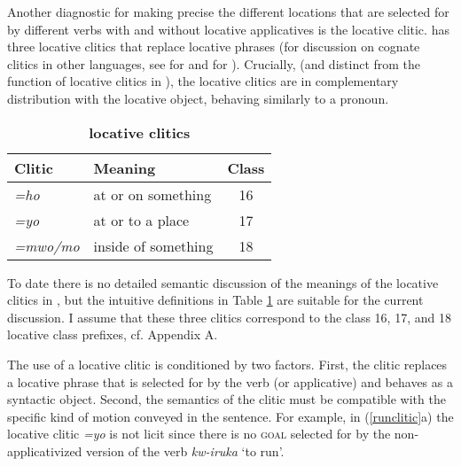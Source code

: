 \documentclass[output=paper]{langsci/langscibook}
\begin{document}
Another diagnostic for making precise the different locations that are selected for by different verbs with and without locative applicatives is the locative clitic.  has three locative clitics that  replace locative phrases (for discussion on cognate clitics in other languages, see \citet{diercks:2011} for  and \citet{simango:2012} for ). 	Crucially, (and distinct from the function of locative clitics in ), the locative clitics are in complementary distribution with the locative object, behaving similarly to a pronoun. 
%
\begin{table}[ht]
      \begin{center}	
\caption{\textbf{ locative clitics}}
      \begin{tabular}[t]{llc}\\\hline
	      Clitic			& Meaning				& Class \\\hline
			\emph{=ho}  & at or on something	& 16 \\
		      
		\emph{=yo} 	&  at or to a place 		& 17 \\

		\emph{=mwo/mo}  &  inside of something & 18\\
      
      \hline
	\end{tabular}
\label{tab:clitic} 
			\end{center}
\end{table}
%
To date there is no detailed semantic discussion of the meanings of the locative clitics in , but the intuitive definitions in Table \ref{tab:clitic} are suitable for the current discussion. I assume that these three clitics correspond to the class 16, 17, and 18 locative class prefixes, cf. Appendix A.  

The use of a locative clitic is conditioned by two factors. First, the clitic replaces a locative phrase that is selected for by the verb (or applicative) and behaves as a syntactic object. Second, the semantics of the clitic must be compatible with the specific kind of motion conveyed in the sentence.  For example, in (\ref{runclitic}a) the locative clitic \emph{=yo} is not licit since there is no {\scshape goal}  selected for by the non-applicativized version of the verb \emph{kw-iruka} `to run'. 
\end{document}
